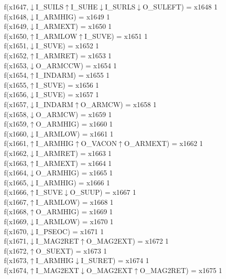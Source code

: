 f(x1647,$\downarrow$I\_SUILS$\uparrow$I\_SUHE$\downarrow$I\_SURLS$\downarrow$O\_SULEFT) = x1648 {1} \\
f(x1648,$\downarrow$I\_ARMHIG) = x1649 {1} \\
f(x1649,$\downarrow$I\_ARMEXT) = x1650 {1} \\
f(x1650,$\uparrow$I\_ARMLOW$\uparrow$I\_SUVE) = x1651 {1} \\
f(x1651,$\downarrow$I\_SUVE) = x1652 {1} \\
f(x1652,$\uparrow$I\_ARMRET) = x1653 {1} \\
f(x1653,$\downarrow$O\_ARMCCW) = x1654 {1} \\
f(x1654,$\uparrow$I\_INDARM) = x1655 {1} \\
f(x1655,$\uparrow$I\_SUVE) = x1656 {1} \\
f(x1656,$\downarrow$I\_SUVE) = x1657 {1} \\
f(x1657,$\downarrow$I\_INDARM$\uparrow$O\_ARMCW) = x1658 {1} \\
f(x1658,$\downarrow$O\_ARMCW) = x1659 {1} \\
f(x1659,$\uparrow$O\_ARMHIG) = x1660 {1} \\
f(x1660,$\downarrow$I\_ARMLOW) = x1661 {1} \\
f(x1661,$\uparrow$I\_ARMHIG$\uparrow$O\_VACON$\uparrow$O\_ARMEXT) = x1662 {1} \\
f(x1662,$\downarrow$I\_ARMRET) = x1663 {1} \\
f(x1663,$\uparrow$I\_ARMEXT) = x1664 {1} \\
f(x1664,$\downarrow$O\_ARMHIG) = x1665 {1} \\
f(x1665,$\downarrow$I\_ARMHIG) = x1666 {1} \\
f(x1666,$\uparrow$I\_SUVE$\downarrow$O\_SUUP) = x1667 {1} \\
f(x1667,$\uparrow$I\_ARMLOW) = x1668 {1} \\
f(x1668,$\uparrow$O\_ARMHIG) = x1669 {1} \\
f(x1669,$\downarrow$I\_ARMLOW) = x1670 {1} \\
f(x1670,$\downarrow$I\_PSEOC) = x1671 {1} \\
f(x1671,$\downarrow$I\_MAG2RET$\uparrow$O\_MAG2EXT) = x1672 {1} \\
f(x1672,$\uparrow$O\_SUEXT) = x1673 {1} \\
f(x1673,$\uparrow$I\_ARMHIG$\downarrow$I\_SURET) = x1674 {1} \\
f(x1674,$\uparrow$I\_MAG2EXT$\downarrow$O\_MAG2EXT$\uparrow$O\_MAG2RET) = x1675 {1} \\
